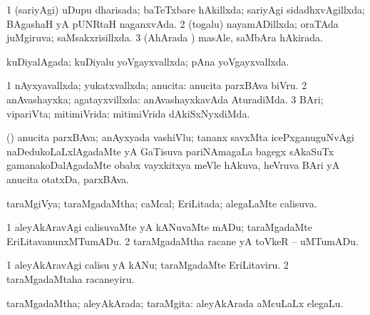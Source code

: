{\bentry
{} 
\gl{\gu}
\expl{}
\bmng
\bnum
\num{1} (sariyAgi) uDupu dharisada; baTeTxbare hAkillxda; sariyAgi sidadhxvAgillxda; BAgashaH yA pUNRtaH naganxvAda. 
\num{2} (togalu) nayamADillxda; oraTAda juMgiruva; saMsakxrisillxda. 
\num{3} (AhArada \vi) masAle, saMbAra hAkirada. 
\enum
\emng
\eentry

\bentry
{} 
\gl{\gu}
\expl{}
\bmng
 kuDiyalAgada; kuDiyalu yoVgayxvallxda; pAna yoVgayxvallxda. 
\emng
\eentry

\bentry
{}
\gl{\saMkiSx}
\expl{}
\bmng
\emng
\eentry

\bentry
{} 
\gl{\gu}
\expl{}
\bmng
\bnum
\num{1} nAyxyavallxda; yukatxvallxda; anucita:  anucita parxBAva biVru. 
\num{2} anAvashayxka; agatayxvillxda:  anAvashayxkavAda AturadiMda. 
\num{3} BAri; vipariVta; mitimiVrida:  mitimiVrida dAkiSxNyxdiMda. 
\enum
\emng
\eentry

\bentry
{}
\gl{\nA}
\expl{}
\bmng
 (\nAyxshA) anucita parxBAva; anAyxyada vashiVlu; tananx savxMta icePxganuguNvAgi naDedukoLaLxlAgadaMte yA GaTisuva pariNAmagaLa bagegx sAkaSuTx gamanakoDalAgadaMte obabx vayxkitxya meVle hAkuva, heVruva BAri yA anucita otatxDa, parxBAva. 
\emng
\eentry

\bentry
{} 
\gl{\gu}
\expl{}
\bmng
 taraMgiVya; taraMgadaMtha; caMcal; EriLitada; alegaLaMte calisuva. 
\emng
\eentry

\bentry
{}
\gl{\nA}
\expl{}
\bmng
\emng
\eentry

\bentry
{} 
\gl{\sakirx}
\expl{}
\bmng
\bnum
\num{1} aleyAkAravAgi calisuvaMte yA kANuvaMte mADu; taraMgadaMte EriLitavanunxMTumADu. 
\num{2} taraMgadaMtha racane yA toVkeR -- uMTumADu. 
\enum
\emng

\noindent
\gl{\akirx}
\expl{}
\bmng
\bnum
\num{1} aleyAkAravAgi calisu yA kANu; taraMgadaMte EriLitaviru. 
\num{2} taraMgadaMtaha racaneyiru. 
\enum
\emng
\eentry

\bentry
{} 
\gl{\gu}
\expl{}
\bmng
 taraMgadaMtha; aleyAkArada; taraMgita:  aleyAkArada aMcuLaLx elegaLu. 
\emng
\eentry

}

